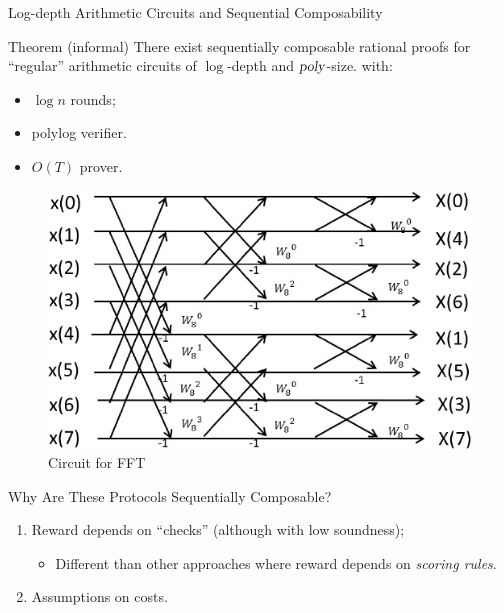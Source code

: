 \begin{frame}[t]{Log-depth Arithmetic Circuits and Sequential Composability}
\begin{block}{Theorem (informal)}
There exist sequentially composable rational proofs for ``regular'' arithmetic circuits of $\log$-depth and ${\textsl{poly}}$-size. with:
		\begin{itemize}
			\item $\log n$ rounds;
			\item polylog verifier.
			\item $O(T)$ prover.
		\end{itemize}
\end{block}

\begin{figure}
	\includegraphics[scale=0.36]{pics/fft.jpg}
	\caption{Circuit for FFT}
\end{figure}
\end{frame}

\begin{frame}{Why Are These Protocols Sequentially Composable?}
	\begin{enumerate}
		\item Reward depends on ``checks'' (although with low soundness);\pause
		\begin{itemize}
			\item Different than other approaches where reward depends on \textit{scoring rules}.
		\end{itemize}\pause
		\item Assumptions on costs.
	\end{enumerate}
\end{frame}

